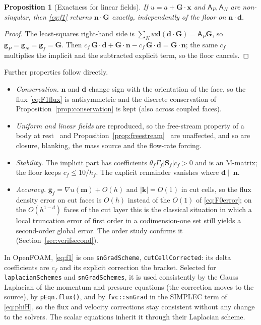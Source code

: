 \documentclass[11pt,a4paper]{article}
\newtheorem{proposition}{Proposition}
\theoremstyle{remark}
\newcommand{\nn}{\bm{n}}
\newcommand{\xx}{\bm{x}}
\newcommand{\Sf}{\bm{S}_f}
\newcommand{\code}[1]{\texttt{#1}}
\begin{document}
\begin{proposition}[Exactness for linear fields]
\label{prop:linear}
If $u=a+\bm G\cdot\xx$ and $\mathsf A_P,\mathsf A_N$ are non-singular, then
\eqref{eq:f1} returns $\nn\cdot\bm G$ exactly, independently of the floor on $\nn\cdot\bm d$.
\end{proposition}
\begin{proof}
The least-squares right-hand side is $\sum_Nw\bm d(\bm d\cdot\bm G)=\mathsf A_P\bm G$, so
$\bm g_P=\bm g_N=\bm g_f=\bm G$. Then
$c_f\,\bm G\cdot\bm d+\bm G\cdot\nn-c_f\,\bm G\cdot\bm d=\bm G\cdot\nn$; the same $c_f$ multiplies
the implicit and the subtracted explicit term, so the floor cancels.
\end{proof}

\noindent Further properties follow directly.
\begin{itemize}\itemsep2pt
\item \emph{Conservation.} $\nn$ and $\bm d$ change sign with the orientation of the face, so
      the flux \eqref{eq:F1flux} is antisymmetric and the discrete conservation of
      Proposition~\ref{prop:conservation} is kept (also across coupled faces).
\item \emph{Uniform and linear fields} are reproduced, so the free-stream property of a body at
      rest%
      \ and Proposition~\ref{prop:freestream}
      \ are unaffected, and so are closure, blanking, the mass source and the flow-rate
      forcing.
\item \emph{Stability.} The implicit part has coefficients $\theta_f\Gamma_f|\Sf|c_f>0$ and is
      an M-matrix; the floor keeps $c_f\le10/h_f$. The explicit remainder vanishes where
      $\bm d\parallel\nn$.
\item \emph{Accuracy.} $\bm g_f=\nabla u(\bm m)+O(h)$ and $|\bm k|=O(1)$ in cut cells, so the flux
      density error on cut faces is $O(h)$ instead of the $O(1)$ of \eqref{eq:F0error}; on the
      $O(h^{1-d})$ faces of the cut layer this is the classical situation in which a local
      truncation error of first order in a codimension-one set still yields a second-order
      global error. The order study confirms it (Section~\ref{sec:verifsecond}).
\end{itemize}

In OpenFOAM, \eqref{eq:f1} is one \code{snGradScheme}, \code{cutCellCorrected}: its delta
coefficients are $c_f$ and its explicit correction the bracket. Selected for
\code{laplacianSchemes} and \code{snGradSchemes}, it is used consistently by the Gauss
Laplacian of the momentum and pressure equations (the correction moves to the source), by
\code{pEqn.flux()}, and by \code{fvc::snGrad} in the SIMPLEC term of \eqref{eq:phiH}, so the flux
and velocity corrections stay consistent without any change to the solvers.
The scalar equations inherit it through their Laplacian scheme.
\end{document}
